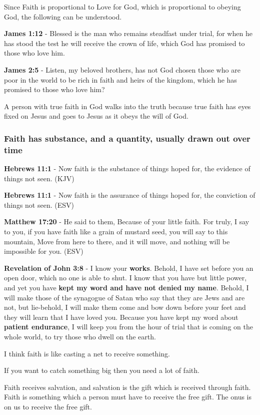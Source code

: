 \documentclass[11pt]{article}
\begin{document}
Since Faith is proportional to Love for God, which is proportional to obeying God, the following can be understood.

\textbf{James 1:12} - Blessed is the man who remains steadfast under trial, for when he has stood the test he will receive the crown of life, which God has promised to those who love him.

\textbf{James 2:5} - Listen, my beloved brothers, has not God chosen those who are poor in the world to be rich in faith and heirs of the kingdom, which he has promised to those who love him?

A person with true faith in God walks into the truth because true faith has eyes fixed on Jesus and goes to Jesus as it obeys the will of God.

\subsubsection{Faith has substance, and a quantity, usually drawn out over time}
\label{sec:orgdd4e1ee}
\textbf{Hebrews 11:1} - Now faith is the substance of things hoped for, the evidence of things not seen. (KJV)

\textbf{Hebrews 11:1} - Now faith is the assurance of things hoped for, the conviction of things not seen. (ESV)

\textbf{Matthew 17:20} - He said to them, Because of your little faith. For truly, I say to you, if you have faith like a grain of mustard seed, you will say to this mountain, Move from here to there, and it will move, and nothing will be impossible for you. (ESV)

\textbf{Revelation of John 3:8} - I know your \textbf{works}. Behold, I have set before you an open door, which no one is able to shut. I know that you have but little power, and yet you have \textbf{kept my word and have not denied my name}. Behold, I will make those of the synagogue of Satan who say that they are Jews and are not, but lie-behold, I will make them come and bow down before your feet and they will learn that I have loved you. Because you have kept my word about \textbf{patient endurance}, I will keep you from the hour of trial that is coming on the whole world, to try those who dwell on the earth.

I think faith is like casting a net to receive something.

If you want to catch something big then you need a lot of faith.

Faith receives salvation, and salvation is the gift which is received through faith.
Faith is something which a person must have to receive the free gift.
The onus is on us to receive the free gift.
\end{document}
